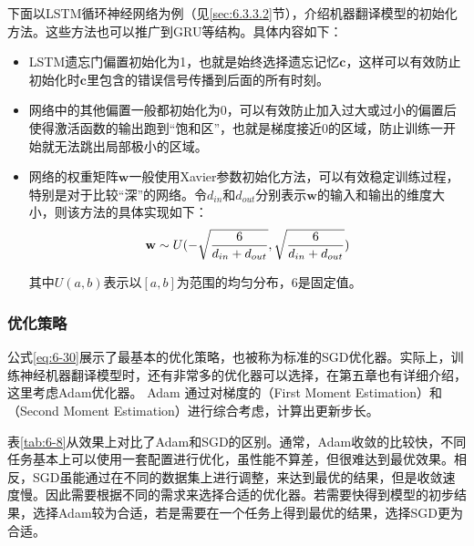 \parinterval 下面以LSTM循环神经网络为例（见\ref{sec:6.3.3.2}节），介绍机器翻译模型的初始化方法。这些方法也可以推广到GRU等结构。具体内容如下：

\begin{itemize}
\vspace{0.5em}
\item LSTM遗忘门偏置初始化为1，也就是始终选择遗忘记忆$\mathbf{c}$，这样可以有效防止初始化时$\mathbf{c}$里包含的错误信号传播到后面的所有时刻。
\vspace{0.5em}
\item 网络中的其他偏置一般都初始化为0，可以有效防止加入过大或过小的偏置后使得激活函数的输出跑到``饱和区''，也就是梯度接近0的区域，防止训练一开始就无法跳出局部极小的区域。
\vspace{0.5em}
\item 网络的权重矩阵$\mathbf{w}$一般使用Xavier参数初始化方法\cite{pmlr-v9-glorot10a}，可以有效稳定训练过程，特别是对于比较``深''的网络。令$d_{in}$和$d_{out}$分别表示$\mathbf{w}$的输入和输出的维度大小，则该方法的具体实现如下：
\begin{eqnarray}
\mathbf{w} \sim U(-\sqrt{ \frac{6} { d_{in} + d_{out} } } , \sqrt{ \frac{6} { d_{in} + d_{out} } })
\label{eq:6-32}
\vspace{0.5em}
\end{eqnarray}

其中$U(a,b)$表示以$[a,b]$为范围的均匀分布，$6$是固定值。
\end{itemize}

\vspace{-0.5em}
\subsubsection{优化策略}

\parinterval 公式\ref{eq:6-30}展示了最基本的优化策略，也被称为标准的SGD优化器。实际上，训练神经机器翻译模型时，还有非常多的优化器可以选择，在第五章也有详细介绍，这里考虑Adam优化器。 Adam 通过对梯度的{\small{}}（First Moment Estimation）和{\small{}}（Second Moment Estimation）进行综合考虑，计算出更新步长。

\parinterval 表\ref{tab:6-8}从效果上对比了Adam和SGD的区别。通常，Adam收敛的比较快，不同任务基本上可以使用一套配置进行优化，虽性能不算差，但很难达到最优效果。相反，SGD虽能通过在不同的数据集上进行调整，来达到最优的结果，但是收敛速度慢。因此需要根据不同的需求来选择合适的优化器。若需要快得到模型的初步结果，选择Adam较为合适，若是需要在一个任务上得到最优的结果，选择SGD更为合适。

